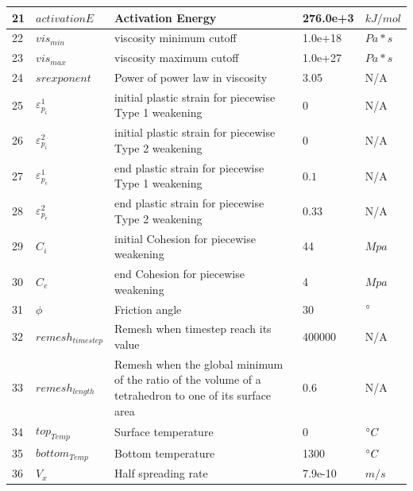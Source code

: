 \begin{table}[h]
\begin{tabular}[h]{l l p{6.8cm} l l}
\hline
21   &  $activationE$    &    Activation Energy      & 276.0e+3   & $kJ/mol$  \\
\hline
22   &  $vis_{min}$    &    viscosity minimum cutoff      & 1.0e+18   & $Pa*s$  \\
\hline
23   &  $vis_{max}$    &    viscosity maximum cutoff      & 1.0e+27   & $Pa*s$  \\
\hline
24   &  $srexponent$    &    Power of power law in viscosity       & 3.05   & N/A  \\
\hline
25   &  $\varepsilon_{p_{i}}^{1}$    &    initial plastic strain for piecewise Type 1 weakening       & $0$   & N/A  \\
\hline
26   &  $\varepsilon_{p_{i}}^{2}$    &    initial plastic strain for piecewise Type 2 weakening       & $0$   & N/A  \\
\hline
27   &  $\varepsilon_{p_{e}}^{1}$    &    end plastic strain for piecewise Type 1 weakening       & $0.1$   & N/A  \\
\hline
28   &  $\varepsilon_{p_{e}}^{2}$    &    end plastic strain for piecewise Type 2 weakening       & $0.33$   & N/A  \\
\hline
29   &  $C_{i}$    &    initial Cohesion for piecewise weakening       & 44   & $Mpa$  \\
\hline
30   &  $C_{e}$    &    end Cohesion for piecewise weakening       & 4   & $Mpa$  \\
\hline
31   &  $\phi$    &    Friction angle      & 30   & $\degree$  \\
\hline
32   &  $remesh_{timestep}$    &    Remesh when timestep reach its value      & 400000   & N/A  \\
\hline
33   &  $remesh_{length}$    &    Remesh when the global minimum of the ratio of the volume of a tetrahedron to one of its surface area      & 0.6   & N/A  \\
\hline
34   &  $top_{Temp}$    &    Surface temperature      & 0   & $\degree C$  \\
\hline
35   &  $bottom_{Temp}$    &    Bottom temperature      & 1300   & $\degree C$  \\
\hline
36   &  $V_{x}$    &    Half spreading rate      & 7.9e-10   & $m/s$  \\

\hline
\hline
\end{tabular}

\label{Tab_ModelParameters}
\end{table}

